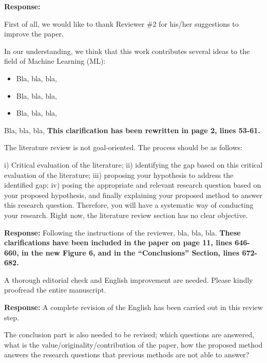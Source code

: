 \documentclass[a4paper,twoside,11pt]{article}
\newcounter{comments}[section]
\newcommand{\rcomment}[1]
{
	\stepcounter{comments}
	\vspace{0.6cm}
	\begin{tcolorbox}[colback=black!5,colframe=white!45!black,title=Comment \arabic{comments}]
		#1
	\end{tcolorbox}
}
\begin{document}
\textbf{Response:}
{
First of all, we would like to thank Reviewer \#2 for his/her suggestions to improve the paper.

In our understanding, we think that this work contributes several ideas to the field of Machine Learning (ML):

\begin{itemize}
	\item Bla, bla, bla,
	\item Bla, bla, bla,
	\item Bla, bla, bla,
\end{itemize}

Bla, bla, bla, \textbf{This clarification has been rewritten in page 2, lines 53-61.}
}

\rcomment
{
The literature review is not goal-oriented. The process should be as follows:

\vspace{0.5cm}
i) Critical evaluation of the literature; ii) identifying the gap based on this critical evaluation of the literature; iii) proposing your hypothesis to address the identified gap; iv) posing the appropriate and relevant research question based on your proposed hypothesis, and finally explaining your proposed method to answer this research question. Therefore, you will have a systematic way of conducting your research. Right now, the literature review section has no clear objective.
}

\textbf{Response:}
{
Following the instructions of the reviewer, bla, bla, bla. \textbf{These clarifications have been included in the paper on page 11, lines 646-660, in the new Figure 6, and in the ``Conclusions'' Section, lines 672-682.}
}

\rcomment
{
A thorough editorial check and English improvement are needed. Please kindly proofread the entire manuscript.

}

\textbf{Response:}
{
A complete revision of the English has been carried out in this review step.
}

\rcomment
{
The conclusion part is also needed to be revised; which questions are answered, what is the value/originality/contribution of the paper, how the proposed method answers the research questions that previous methods are not able to answer?
}
\end{document}
